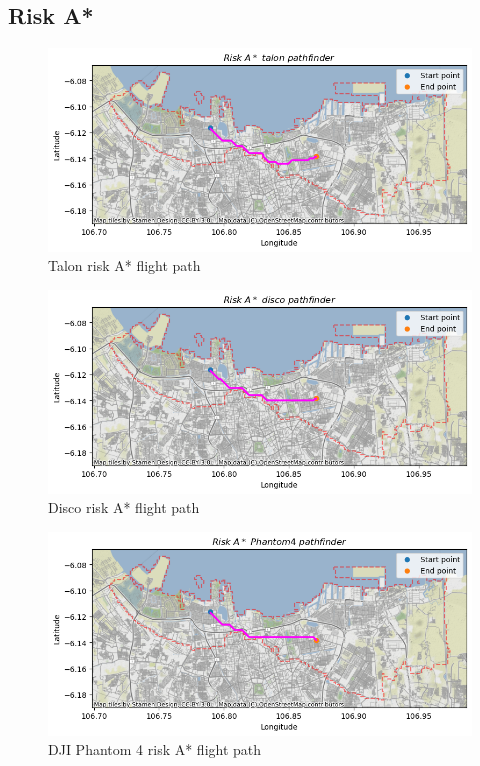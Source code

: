 \documentclass[12pt]{report}
\begin{document}
        \subsection{Risk A*}
        \begin{figure}[H]
            \centering
            \includegraphics[width=\textwidth]{Plot/talon/talon_route.png}
            \caption{Talon risk A* flight path}
        \end{figure}
        \begin{figure}[H]
            \centering
            \includegraphics[width=\textwidth]{Plot/parrot/parrot_route.png}
            \caption{Disco risk A* flight path}
        \end{figure}
        \begin{figure}[H]
            \centering
            \includegraphics[width=\textwidth]{Plot/phantom4/phantom_route.png}
            \caption{DJI Phantom 4 risk A* flight path}
        \end{figure}
\end{document}

